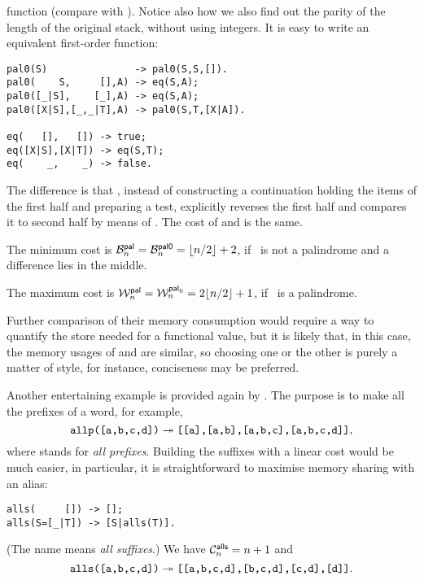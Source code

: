 function (compare with ). Notice also how we also find
out the parity of the length of the original stack, without using
integers. It is easy to write an equivalent first\hyp{}order function:
\begin{verbatim}
pal0(S)               -> pal0(S,S,[]).
pal0(    S,     [],A) -> eq(S,A);
pal0([_|S],    [_],A) -> eq(S,A);
pal0([X|S],[_,_|T],A) -> pal0(S,T,[X|A]).

eq(   [],   []) -> true;
eq([X|S],[X|T]) -> eq(S,T);
eq(    _,    _) -> false.
\end{verbatim}
The difference is that , instead of constructing a
continuation holding the items of the first half and preparing a test,
explicitly reverses the first half and compares it to second half by
means of . The cost of  and
 is the same.

The minimum cost is \(\B{\fun{pal}}{n} = \B{\fun{pal0}}{n} =
\floor{n/2} + 2\), if ~is not a palindrome and a difference
lies in the middle.

The maximum cost is \(\W{\fun{pal}}{n} = \W{\fun{pal}_0}{n} =
2\floor{n/2} + 1\), if ~is a
palindrome.

Further comparison of their memory consumption would require a way to
quantify the store needed for a functional value, but it is likely
that, in this case, the memory usages of  and
 are similar, so choosing one or the other is purely a
matter of style, for instance, conciseness may be preferred.


Another entertaining example is provided again by
\cite{Danvy_1988,Danvy_1989}. The purpose is to make all the prefixes
of a word, for example,
\begin{equation*}
\erlcode{allp([a,b,c,d])} \twoheadrightarrow
\erlcode{[[a],[a,b],[a,b,c],[a,b,c,d]]},
\end{equation*}
where  stands for \emph{all prefixes}. Building the
suffixes with a linear cost would be much easier, in particular, it is
straightforward to maximise memory sharing with an alias:
\begin{verbatim}
alls(     []) -> [];
alls(S=[_|T]) -> [S|alls(T)].
\end{verbatim}
(The name  means \emph{all suffixes}.) We have
\(\C{\fun{alls}}{n} = n + 1\) and
\begin{equation*}
\erlcode{alls([a,b,c,d])}
\twoheadrightarrow \erlcode{[[a,b,c,d],[b,c,d],[c,d],[d]]}.
\end{equation*}

